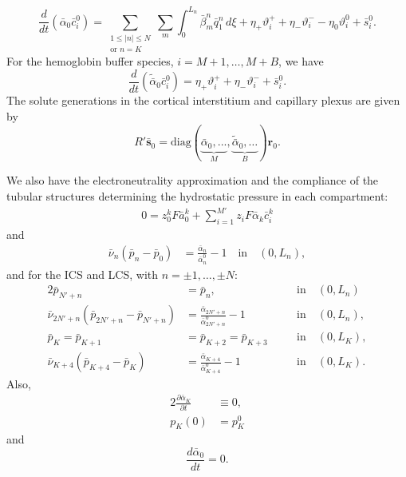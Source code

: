 \documentclass{article}
\begin{document}
\begin{equation}
    \frac{d}{d t}(\bar{\alpha}_0 \bar{c}_i^0) =  
        \sum_{\substack{1\leq|n|\leq N\\\text{or } n=K}}\sum_m\int_0^{L_n}\bar{\beta}_m^n\bar{q}_{1}^n\,d\xi+\eta_+\vartheta_i^+ + \eta_-\vartheta_i^- -\eta_0\vartheta_i^0+\bar{s}_i^0.
\end{equation}
For the hemoglobin buffer species, $i=M+1,\dots,M+B$, we have
\begin{equation}
    \frac{d}{d t}(\tilde{\bar{\alpha}}_0 \bar{c}_i^0) = 
    \eta_+\vartheta_i^++\eta_-\vartheta_i^-+\bar{s}_i^0.
\end{equation}
The solute generations in the cortical interstitium and capillary plexus are given by
\begin{equation}
    R'\bar{\mathbf{s}}_0 = \mathrm{diag}(\underbrace{\bar{\alpha}_0,...}_{M},\underbrace{\tilde{\bar{\alpha}}_0,\dots}_B)\mathbf{r}_0.
\end{equation}

We also have the electroneutrality approximation and the compliance of the tubular structures determining the hydrostatic pressure in each compartment:
\begin{gather}
    0=z_0^k F\bar{a}_0^k+\sum_{i=1}^{M'}z_iF\bar{\alpha}_k \bar{c}_i^k
\end{gather}
and
\begin{align}
    \bar{\nu}_n(\bar{p}_n - \bar{p}_0) &= \frac{\bar{\alpha}_n}{\bar{\alpha}_n^0}-1\quad\text{in}\quad (0,L_n),
\end{align}
and for the ICS and LCS, with $n=\pm 1,\dots,\pm N$:
\begin{alignat}{2}
    \bar{p}_{N'+n} &= \bar{p}_n,\quad &&\text{in}\quad (0,L_n) \\ 
    \bar{\nu}_{2N'+n}(\bar{p}_{2N'+n} - \bar{p}_{N'+n}) &= \frac{\bar{\alpha}_{2N'+n}}{\bar{\alpha}_{2N'+n}^0}-1\quad &&\text{in}\quad (0,L_n),\\
    \bar{p}_K=\bar{p}_{K+1}&=\bar{p}_{K+2}=\bar{p}_{K+3}\quad &&\text{in}\quad (0,L_K),\\
    \bar{\nu}_{K+4}(\bar{p}_{K+4} - \bar{p}_{K}) &= \frac{\bar{\alpha}_{K+4}}{\bar{\alpha}_{K+4}^0}-1\quad &&\text{in}\quad (0,L_K).
\end{alignat}
Also,
\begin{alignat}{2}
    \frac{\partial\bar{\alpha}_K}{\partial t}&\equiv 0,\\
    p_K(0) &= p_K^0
\end{alignat}
and
\begin{equation}
    \frac{d \bar{\alpha}_0}{dt} = 0.
\end{equation}
\end{document}
